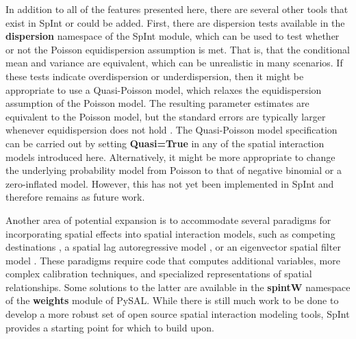 \documentclass[11pt]{article}
\begin{document}
    In addition to all of the features presented here, there are several
other tools that exist in SpInt or could be added. First, there are
dispersion tests available in the \textbf{dispersion} namespace of the
SpInt module, which can be used to test whether or not the Poisson
equidispersion assumption is met. That is, that the conditional mean
and variance are equivalent, which can be unrealistic in many scenarios.
If these tests indicate overdispersion or underdispersion, then it might
be appropriate to use a Quasi-Poisson model, which relaxes the
equidispersion assumption of the Poisson model. The resulting parameter
estimates are equivalent to the Poisson model, but the standard errors
are typically larger whenever equidispersion does not hold \citep{wedderburn_quasi-likelihood_1974}. The Quasi-Poisson model specification can be carried out by
setting \textbf{Quasi=True} in any of the spatial interaction models introduced here. Alternatively, it might be more appropriate to change the
underlying probability model from Poisson to that of negative binomial
or a zero-inflated model. However, this has not yet been implemented in
SpInt and therefore remains as future work.

Another area of potential expansion is to accommodate several paradigms for
incorporating spatial effects into spatial interaction models, such as
competing destinations \citep{fotheringham_new_1983}, a spatial lag
autoregressive model \citep{lesage_spatial_2008}, or an eigenvector spatial
filter model \citep{chun_modeling_2008}. These paradigms require code that computes
additional variables, more complex calibration techniques, and specialized
representations of spatial relationships. Some solutions to the
latter are available in the \textbf{spintW} namespace of the
\textbf{weights} module of PySAL. While there is still much work to be done to
develop a more robust set of open source spatial interaction modeling tools, SpInt provides a starting point for which to build upon.



    
    
    
    
    
    
\end{document}
